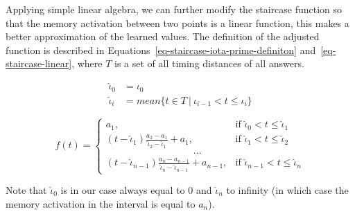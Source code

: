 Applying simple linear algebra, we can further modify the staircase function so that the memory activation between two points is a linear function, this makes a better approximation of the learned values. The definition of the adjusted function is described in Equations~\ref{eq-staircase-iota-prime-definiton} and~\ref{eq-staircase-linear}, where $T$ is a set of all timing distances of all answers.

\begin{equation} \label{eq-staircase-iota-prime-definiton}
\begin{split}
  \hat{\iota}_0 &= \iota_0 \\
  \hat{\iota}_i &= \mathit{mean}\{t \in T~|~\iota_{i-1} < t \leq \iota_i\}
\end{split}
\end{equation}

\begin{equation} \label{eq-staircase-linear}
  f(t) = \begin{cases}
            a_1, & \text{if } \hat{\iota}_0 < t \leq \hat{\iota}_1 \\
            (t - \hat{\iota}_1) \frac{a_2 - a_1}{\hat{\iota}_2 - \hat{\iota}_1} + a_1, & \text{if } \hat{\iota}_1 < t \leq \hat{\iota}_2 \\
            \hspace{9em} \dots \\
            (t - \hat{\iota}_{n-1}) \frac{a_n - a_{n-1}}{\hat{\iota}_n - \hat{\iota}_{n-1}} + a_{n-1}, & \text{if } \hat{\iota}_{n-1} < t \leq \hat{\iota}_n     
         \end{cases}
\end{equation}

Note that $\hat{\iota}_0$ is in our case always equal to $0$ and $\hat{\iota}_n$ to infinity (in which case the memory activation in the interval is equal to $a_n$).
